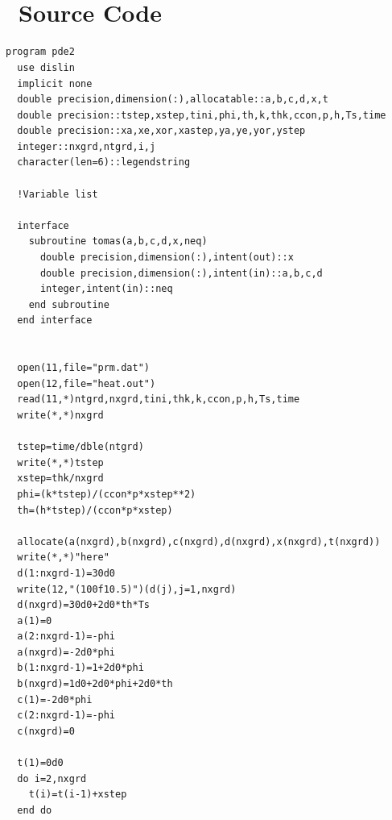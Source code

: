 \documentclass[titlepage,11pt]{article}
\begin{document}
\appendix
\newcommand{\appsection}[1]{\let\oldthesection\thesection
  \renewcommand{\thesection}{Appendix \oldthesection}
  \section{#1}\let\thesection\oldthesection}
\appsection{\\~Source Code} \label{sec:source}
\begin{singlespacing}
\begin{small}
\begin{Verbatim}[frame=single]
program pde2
  use dislin
  implicit none
  double precision,dimension(:),allocatable::a,b,c,d,x,t
  double precision::tstep,xstep,tini,phi,th,k,thk,ccon,p,h,Ts,time
  double precision::xa,xe,xor,xastep,ya,ye,yor,ystep
  integer::nxgrd,ntgrd,i,j
  character(len=6)::legendstring

  !Variable list

  interface
    subroutine tomas(a,b,c,d,x,neq)
      double precision,dimension(:),intent(out)::x
      double precision,dimension(:),intent(in)::a,b,c,d
      integer,intent(in)::neq
    end subroutine
  end interface


  open(11,file="prm.dat")
  open(12,file="heat.out")
  read(11,*)ntgrd,nxgrd,tini,thk,k,ccon,p,h,Ts,time
  write(*,*)nxgrd

  tstep=time/dble(ntgrd)
  write(*,*)tstep
  xstep=thk/nxgrd
  phi=(k*tstep)/(ccon*p*xstep**2)
  th=(h*tstep)/(ccon*p*xstep)

  allocate(a(nxgrd),b(nxgrd),c(nxgrd),d(nxgrd),x(nxgrd),t(nxgrd))
  write(*,*)"here"
  d(1:nxgrd-1)=30d0
  write(12,"(100f10.5)")(d(j),j=1,nxgrd)
  d(nxgrd)=30d0+2d0*th*Ts
  a(1)=0
  a(2:nxgrd-1)=-phi
  a(nxgrd)=-2d0*phi
  b(1:nxgrd-1)=1+2d0*phi
  b(nxgrd)=1d0+2d0*phi+2d0*th
  c(1)=-2d0*phi
  c(2:nxgrd-1)=-phi
  c(nxgrd)=0

  t(1)=0d0
  do i=2,nxgrd
    t(i)=t(i-1)+xstep
  end do


\end{Verbatim}
\end{small}
\end{singlespacing}
\end{document}
